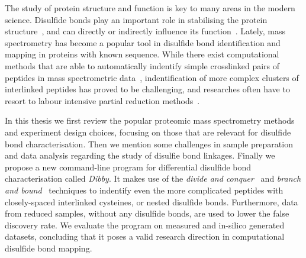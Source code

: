 

The study of protein structure and function is key to many areas in the modern science. Disulfide bonds play an important role in stabilising the protein structure~\cite{wedemeyer2000disulfide}, and can directly or indirectly influence its function~\cite{nagahara2011intermolecular}. Lately, mass spectrometry has become a popular tool in disulfide bond identification and mapping in proteins with known sequence. While there exist computational methods that are able to automatically indentify simple crosslinked pairs of peptides in mass spectrometric data~\cite{lakbub2018recent, liu2014facilitating}, indentification of more complex clusters of interlinked peptides has proved to be challenging, and researches often have to resort to labour intensive partial reduction methods~\cite{wu1997novel, li2013disulfide}.

In this thesis we first review the popular proteomic mass spectrometry methods and experiment design choices, focusing on those that are relevant for disulfide bond characterisation. Then we mention some challenges in sample preparation and data analysis regarding the study of disulfie bond linkages. Finally we propose a new command-line program for differential disulfide bond characterisation called \emph{Dibby}. It makes use of the \emph{divide and conquer}~\cite{smith1985design} and \emph{branch and bound}~\cite{boyd2007branch} techniques to indentify even the more complicated peptides with closely-spaced interlinked cysteines, or nested disulfide bonds. Furthermore, data from reduced samples, without any disulfide bonds, are used to lower the false discovery rate. We evaluate the program on measured and in-silico generated datasets, concluding that it poses a valid research direction in computational disulfide bond mapping.